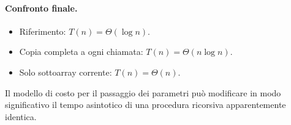 \paragraph{Confronto finale.}
\begin{itemize}
	\item Riferimento: $T(n) = \Theta(\log n)$.
	\item Copia completa a ogni chiamata: $T(n) = \Theta(n \log n)$.
	\item Solo sottoarray corrente: $T(n) = \Theta(n)$.
\end{itemize}
Il modello di costo per il passaggio dei parametri può modificare in modo significativo il
tempo asintotico di una procedura ricorsiva apparentemente identica.


